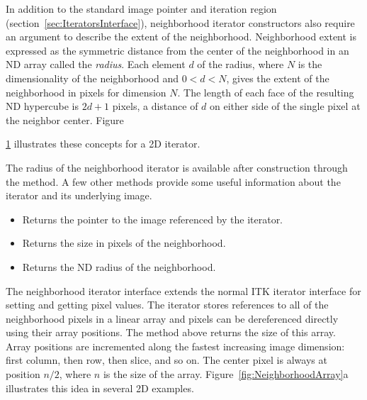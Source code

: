 In addition to the standard image pointer and iteration region
(section~\ref{sec:IteratorsInterface}), neighborhood iterator constructors also
require an argument to describe the extent of the neighborhood.  Neighborhood
extent is expressed as the symmetric distance from the center of the
neighborhood in an ND array called the \emph{radius}. Each element $d$ of the
radius, where $N$ is the dimensionality of the neighborhood and $0 < d < N$,
gives the extent of the neighborhood in pixels for dimension $N$.  The length
of each face of the resulting ND hypercube is $2d + 1$ pixels, a distance of
$d$ on either side of the single pixel at the neighbor center.
Figure~{\ref{fig:NeighborhoodIteratorRadius} illustrates these concepts for a
2D iterator.

\begin{figure}
\centering
\itkcaption[]{  }
\protect\label{fig:NeighborhoodIteratorRadius}
\end{figure}

The radius of the neighborhood iterator is available after construction
through the  method.  A few other methods provide some useful
information about the iterator and its underlying image.

\begin{itemize}
\item \textbf{} Returns the pointer to
the image referenced by the iterator.

\item \textbf{} Returns the size in pixels of the
neighborhood.

\item \textbf{} Returns the ND radius of the
neighborhood.

\end{itemize}


The neighborhood iterator interface extends the normal ITK iterator interface
for setting and getting pixel values.  The iterator stores references to all of
the neighborhood pixels in a linear array and pixels can be dereferenced
directly using their array positions.  The  method above returns the
size of this array.  Array positions are incremented along the fastest
increasing image dimension: first column, then row, then slice, and so on.  The
center pixel is always at position $n/2$, where $n$ is the size of the array.
Figure~\ref{fig:NeighborhoodArray}a illustrates this idea in several 2D
examples.

}
